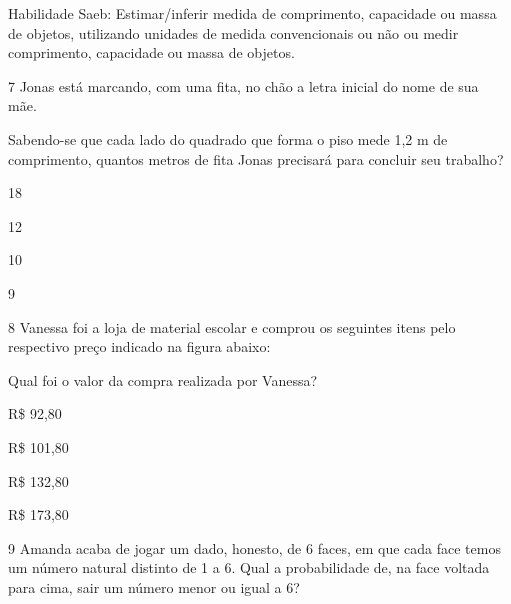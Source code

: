 {{Habilidade Saeb: Estimar/inferir medida de comprimento, capacidade ou
massa de objetos, utilizando unidades de medida convencionais ou não ou
medir comprimento, capacidade ou massa de objetos.}

\num{7} Jonas está marcando, com uma fita, no chão a letra inicial do nome
de sua mãe.


Sabendo-se que cada lado do quadrado que forma o piso mede 1,2 m de
comprimento, quantos metros de fita Jonas precisará para concluir seu
trabalho?

\begin{escolha}
\item
  18
\item
  12
\item
  10
\item
  9
\end{escolha}


\num{8} Vanessa foi a loja de material escolar e comprou os seguintes itens
pelo respectivo preço indicado na figura abaixo:


Qual foi o valor da compra realizada por Vanessa?

\begin{escolha}
\item
  R\$ 92,80
\item
  R\$ 101,80
\item
  R\$ 132,80
\item
  R\$ 173,80
\end{escolha}


\num{9} Amanda acaba de jogar um dado, honesto, de 6 faces, em que cada
face temos um número natural distinto de 1 a 6. Qual a probabilidade de,
na face voltada para cima, sair um número menor ou igual a 6?

}

